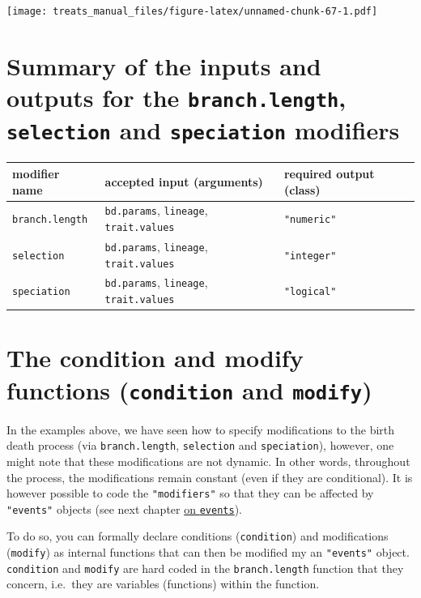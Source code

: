 \documentclass[
]{book}
\begin{document}
\texttt{[image: treats\_manual\_files/figure-latex/unnamed-chunk-67-1.pdf]}

\hypertarget{summarymodifiers}{%
\section{\texorpdfstring{Summary of the inputs and outputs for the \texttt{branch.length}, \texttt{selection} and \texttt{speciation} modifiers}{Summary of the inputs and outputs for the branch.length, selection and speciation modifiers}}\label{summarymodifiers}}

\begin{longtable}[]{@{}lll@{}}
\toprule
modifier name & accepted input (arguments) & required output (class)\tabularnewline
\midrule
\endhead
\texttt{branch.length} & \texttt{bd.params}, \texttt{lineage}, \texttt{trait.values} & \texttt{"numeric"}\tabularnewline
\texttt{selection} & \texttt{bd.params}, \texttt{lineage}, \texttt{trait.values} & \texttt{"integer"}\tabularnewline
\texttt{speciation} & \texttt{bd.params}, \texttt{lineage}, \texttt{trait.values} & \texttt{"logical"}\tabularnewline
\bottomrule
\end{longtable}

\hypertarget{the-condition-and-modify-functions-condition-and-modify}{%
\section{\texorpdfstring{The condition and modify functions (\texttt{condition} and \texttt{modify})}{The condition and modify functions (condition and modify)}}\label{the-condition-and-modify-functions-condition-and-modify}}

In the examples above, we have seen how to specify modifications to the birth death process (via \texttt{branch.length}, \texttt{selection} and \texttt{speciation}), however, one might note that these modifications are not dynamic.
In other words, throughout the process, the modifications remain constant (even if they are conditional).
It is however possible to code the \texttt{"modifiers"} so that they can be affected by \texttt{"events"} objects (see next chapter \protect\hyperlink{makeevents}{on \texttt{events}}).

To do so, you can formally declare conditions (\texttt{condition}) and modifications (\texttt{modify}) as internal functions that can then be modified my an \texttt{"events"} object.
\texttt{condition} and \texttt{modify} are hard coded in the \texttt{branch.length} function that they concern, i.e.~they are variables (functions) within the function.
\end{document}

